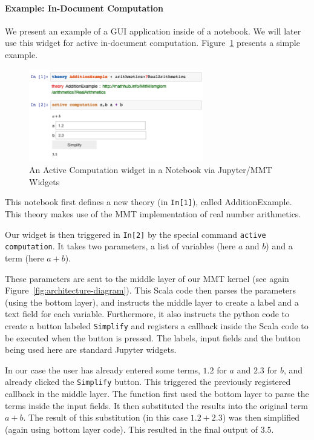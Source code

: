 \paragraph*{Example: In-Document Computation}
We present an example of a GUI application inside of a notebook. 
We will later use this widget for active in-document computation. 
Figure~\ref{fig:ac} presents a simple example. 

\begin{figure}\vspace*{-2.5em}
  \includegraphics[width=0.68\textwidth]{screenshots/activecomp}\vspace*{-1em}
  \caption{An Active Computation widget in a Notebook via Jupyter/MMT Widgets}\label{fig:ac}
  \vspace{-20pt}
\end{figure}
This notebook first defines a new theory (in \texttt{In[1]}), called AdditionExample.
This theory makes use of the MMT implementation of real number arithmetics.  

Our widget is then triggered in \texttt{In[2]} by the special command \texttt{active computation}. 
It takes two parameters, a list of variables (here $a$ and $b$) and a term (here $a + b$). 

These parameters are sent to the middle layer of our MMT kernel (see again Figure~\ref{fig:architecture-diagram}). 
This Scala code then parses the parameters (using the bottom layer), and instructs the middle layer to create a label and a text field for each variable. 
Furthermore, it also instructs the python code to create a button labeled \texttt{Simplify} and registers a callback inside the Scala code to be executed when the button is pressed. 
The labels, input fields and the button being used here are standard Jupyter widgets. 

In our case the user has already entered some terms, $1.2$ for $a$ and $2.3$ for $b$, and already clicked the \texttt{Simplify} button. 
This triggered the previously registered callback in the middle layer. 
The function first used the bottom layer to parse the terms inside the input fields. 
It then substituted the results into the original term $a + b$. 
The result of this substitution (in this case $1.2 + 2.3$) was then simplified (again using bottom layer code). 
This resulted in the final output of $3.5$. 

